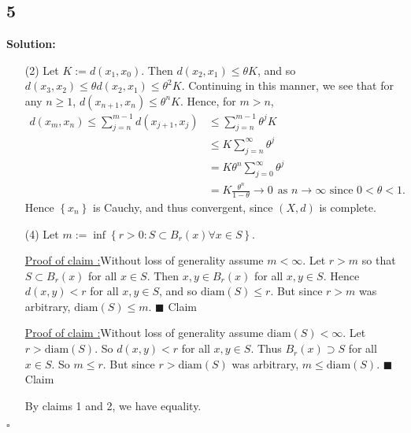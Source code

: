 \documentclass[12pt]{article}
\newcounter{ProofCounter}
\newcounter{ClaimCounter}[ProofCounter]
\newenvironment{Solution}{\stepcounter{ProofCounter}\textbf{Solution:}}{\hfill$\square$}
\newenvironment{claim}[1]{\vspace{1mm}\stepcounter{ClaimCounter}\par\noindent\underline{\bf Claim \theClaimCounter:}\space#1}{}
\newenvironment{claimproof}[1]{\par\noindent\underline{Proof of claim \theClaimCounter:}\space#1}{\hfill $\blacksquare$ Claim \theClaimCounter}
\begin{document}
\subsection*{5}
\begin{Solution}
  \begin{enumerate}
    \item[(2)] Let $K := d(x_1, x_0)$. Then $d(x_2, x_1) \leq \theta K$, and so $d(x_3, x_2) \leq \theta d(x_2, x_1) \leq \theta^{2} K$. Continuing in
      this manner, we see that for any $n \geq 1$, $d(x_{n+1}, x_{n}) \leq \theta^{n} K$. Hence, for $m > n$,
      \begin{align*}
        d(x_m, x_n) \leq \sum_{j=n}^{m-1}d(x_{j+1}, x_j) & \leq \sum_{j=n}^{m-1}\theta^{j}K \\
        & \leq K\sum_{j=n}^{\infty}\theta^{j} \\
        & = K\theta^{n}\sum_{j=0}^{\infty}\theta^{j} \\
        & = K\frac{\theta^{n}}{1 - \theta} \rightarrow 0 \ \ \text{as } n \rightarrow \infty \text{ since } 0 < \theta < 1.
      \end{align*}
      Hence $\left\{ x_n \right\}$ is Cauchy, and thus convergent, since $(X,d)$ is complete.

    \item[(4)] Let $m := \inf\left\{ r > 0 : S\subset B_{r}(x) \forall x \in S \right\}$.

      \begin{claimproof}
        Without loss of generality assume $m < \infty$. Let $r > m$ so that $S \subset B_{r}(x)$ for all $x \in S$. Then $x,y \in B_{r}(x)$ for all
        $x,y \in S$. Hence $d(x,y) < r$ for all $x,y \in S$, and so $\text{diam}(S) \leq r$. But since $r > m$ was arbitrary, $\text{diam}(S) \leq m$.
      \end{claimproof}

      \begin{claimproof}
        Without loss of generality assume $\text{diam}(S) < \infty$. Let $r > \text{diam}(S)$. So $d(x,y) < r$ for all $x,y \in S$. Thus $B_{r}(x)
        \supset S$ for all $x \in S$. So $m \leq r$. But since $r > \text{diam}(S)$ was arbitrary, $m \leq \text{diam}(S)$.
      \end{claimproof}

      By claims 1 and 2, we have equality.
  \end{enumerate}
\end{Solution}
\end{document}
